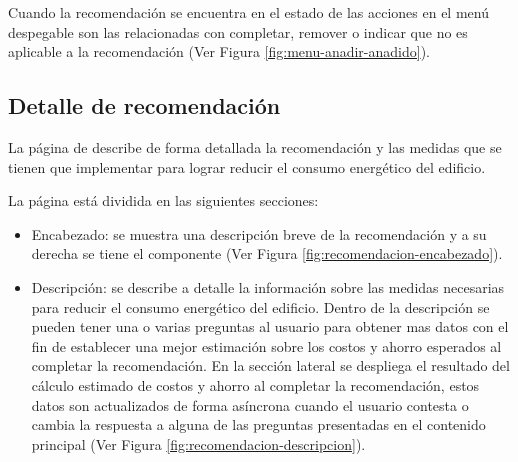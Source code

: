 
Cuando la recomendación se encuentra en el estado de  las
acciones en el menú despegable son las relacionadas con completar, remover o indicar
que no es aplicable a la recomendación (Ver Figura \ref{fig:menu-anadir-anadido}).

\subsection{Detalle de recomendación}

La página de  describe de forma detallada la
recomendación y las medidas que se tienen que implementar para lograr reducir
el consumo energético del edificio.

La página está dividida en las siguientes secciones:
\begin{itemize}
\item Encabezado: se muestra una descripción breve de la recomendación y a su
  derecha se tiene el componente  (Ver Figura
  \ref{fig:recomendacion-encabezado}).
\item Descripción: se describe a detalle la información sobre las medidas
  necesarias para reducir el consumo energético del edificio.
  Dentro de la descripción se pueden tener una o varias preguntas al usuario
  para obtener mas datos con el fin de establecer una mejor
  estimación sobre los costos y ahorro esperados al completar la recomendación.
  En la sección lateral se despliega el resultado del cálculo estimado
  de costos y ahorro al completar la recomendación, estos datos son
  actualizados de forma asíncrona cuando el usuario contesta o cambia
  la respuesta a alguna de las preguntas presentadas en el contenido
  principal (Ver Figura \ref{fig:recomendacion-descripcion}).
\end{itemize}

